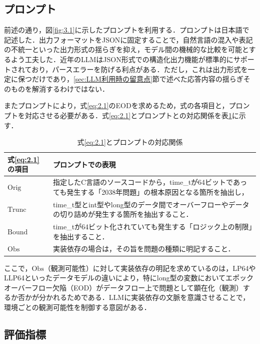\documentclass[submit,techrep,noauthor]{ipsj}
\begin{document}
\subsection{プロンプト}

前述の通り，図\ref{fig:3.1}に示したプロンプトを利用する．プロンプトは日本語で記述した．出力フォーマットをJSON\cite{ref8}に固定することで，自然言語の混入や表記の不統一といった出力形式の揺らぎを抑え，モデル間の機械的な比較を可能とするよう工夫した．近年のLLMはJSON形式での構造化出力機能が標準的にサポートされており\cite{ref9}，パースエラーを防げる利点がある．ただし，これは出力形式を一定に保つだけであり，\ref{sec:LLM利用時の留意点}節で述べた応答内容の揺らぎそのものを解消するわけではない．

またプロンプトにより，式\ref{eq:2.1}のEODを求めるため，式の各項目と，プロンプトを対応させる必要がある．式\ref{eq:2.1}とプロンプトとの対応関係を表\ref{tab:4.1}に示す．

\begin{table}[bt]
	\centering
	\caption{式\ref{eq:2.1}とプロンプトの対応関係}
	\label{tab:4.1}
	\begin{tabular}{|l|p{5cm}|}
\hline
\textbf{式\ref{eq:2.1}の項目} & \textbf{プロンプトでの表現} \\
\hline
$\mathrm{Orig}$ & 指定したC言語のソースコードから，time\_tが64ビットであっても発生する「2038年問題」の根本原因となる箇所を抽出し， \\
\hline
$\mathrm{Trunc}$ & time\_t型とint型やlong型のデータ間でオーバーフローやデータの切り詰めが発生する箇所を抽出すること． \\
\hline
$\mathrm{Bound}$ & time\_tが64ビット化されていても発生する「ロジック上の制限」を抽出すること． \\
\hline
$\mathrm{Obs}$ & 実装依存の場合は，その旨を問題の種類に明記すること． \\
\hline
\end{tabular}
\end{table}

ここで，$\mathrm{Obs}$（観測可能性）に対して実装依存の明記を求めているのは，LP64やLLP64といったデータモデルの違いにより，特にlong型の変数においてエポックオーバーフロー欠陥（EOD）がデータフロー上で問題として顕在化（観測）するか否かが分かれるためである．LLMに実装依存の文脈を意識させることで，環境ごとの観測可能性を制御する意図がある．

\subsection{評価指標}
\end{document}
